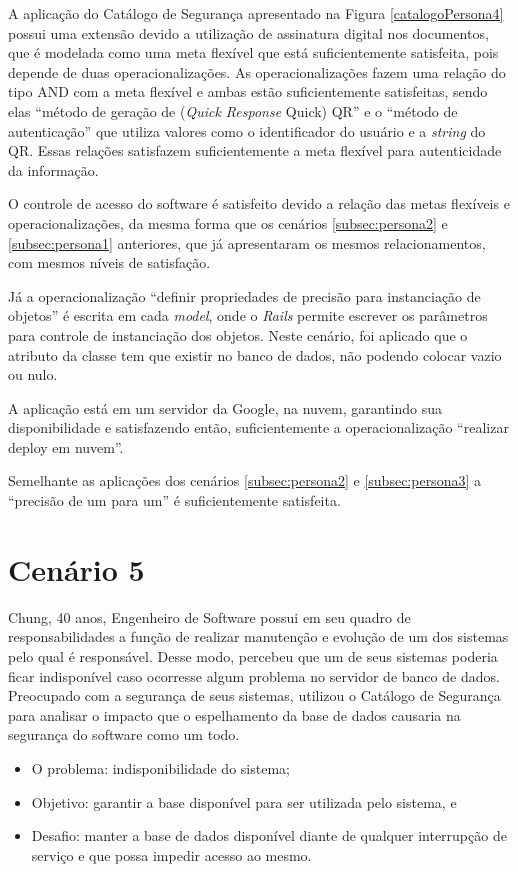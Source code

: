 A aplicação do Catálogo de Segurança apresentado na Figura \ref{catalogoPersona4} possui uma extensão devido a utilização de assinatura digital nos documentos, que é modelada como uma meta flexível que está suficientemente satisfeita, pois depende de duas operacionalizações. As operacionalizações fazem uma relação do tipo AND com a meta flexível e ambas estão suficientemente satisfeitas, sendo elas “método de geração de (\textit{Quick Response} Quick) QR” e o  “método de autenticação” que utiliza valores como o identificador do usuário e a \textit{string} do QR. Essas relações satisfazem suficientemente a meta flexível para autenticidade da informação. 

O controle de acesso do software é satisfeito devido a relação das metas flexíveis e operacionalizações, da mesma forma que os cenários \ref{subsec:persona2} e \ref{subsec:persona1} anteriores, que já apresentaram os mesmos relacionamentos, com mesmos níveis de satisfação.  

Já a operacionalização “definir propriedades de precisão para instanciação de objetos” é escrita em cada \textit{model}, onde o \textit{Rails} permite escrever os parâmetros para controle de instanciação dos objetos. Neste cenário, foi aplicado que o atributo da classe tem que existir no banco de dados, não podendo colocar vazio ou nulo. 

A aplicação está em um servidor da Google, na nuvem, garantindo sua disponibilidade e satisfazendo então, suficientemente a operacionalização “realizar deploy em nuvem”. 

Semelhante as aplicações dos cenários \ref{subsec:persona2} e \ref{subsec:persona3} a “precisão de um para um” é suficientemente satisfeita. 

\section{Cenário 5}
\label{subsec:persona5}

Chung, 40 anos, Engenheiro de Software possui em seu quadro de responsabilidades a função de realizar manutenção e evolução de um dos sistemas pelo qual é responsável. Desse modo, percebeu que um de seus sistemas poderia ficar indisponível caso ocorresse algum problema no servidor de banco de dados. Preocupado com a segurança de seus sistemas, utilizou o Catálogo de Segurança para analisar o impacto que o espelhamento da base de dados causaria na segurança do software como um todo. 

\begin{itemize}
	\item O problema: indisponibilidade do sistema; 
	\item Objetivo: garantir a base disponível para ser utilizada pelo sistema, e
	\item Desafio: manter a base de dados disponível diante de qualquer interrupção de serviço e que possa impedir acesso ao mesmo.
\end{itemize}

